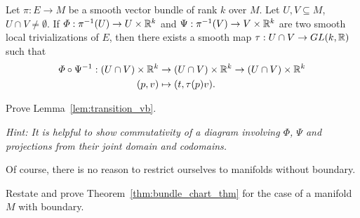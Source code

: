\begin{lemma}\label{lem:transition_vb}
  Let $\pi:E \to M$ be a smooth vector bundle of rank $k$ over $M$. Let $U,V\subseteq M$, $U\cap V\neq \emptyset$.
  If $\varPhi : \pi^{-1}(U) \to U \times \mathbb{R}^k$ and $\Psi: \pi^{-1}(V) \to V \times \mathbb{R}^k$ are two smooth local trivializations of $E$, then there exists a smooth map $\tau: U\cap V \to GL(k, \mathbb{R})$ such that
  \begin{align}
    \varPhi\circ\Psi^{-1} : (U\cap V)\times\mathbb{R}^k &\to (U\cap V)\times \mathbb{R}^k \to (U\cap V)\times \mathbb{R}^k \\
                            (p,v) &\mapsto (t, \tau(p) v).
  \end{align}
\end{lemma}
\begin{exercise}
  Prove Lemma~\ref{lem:transition_vb}.

  \textit{\small Hint: It is helpful to show commutativity of a diagram involving $\varPhi$, $\Psi$ and projections from their joint domain and codomains.}
\end{exercise}

Of course, there is no reason to restrict ourselves to manifolds without boundary.
\begin{exercise}
  Restate and prove Theorem~\ref{thm:bundle_chart_thm} for the case of a manifold $M$ with boundary.
\end{exercise}

